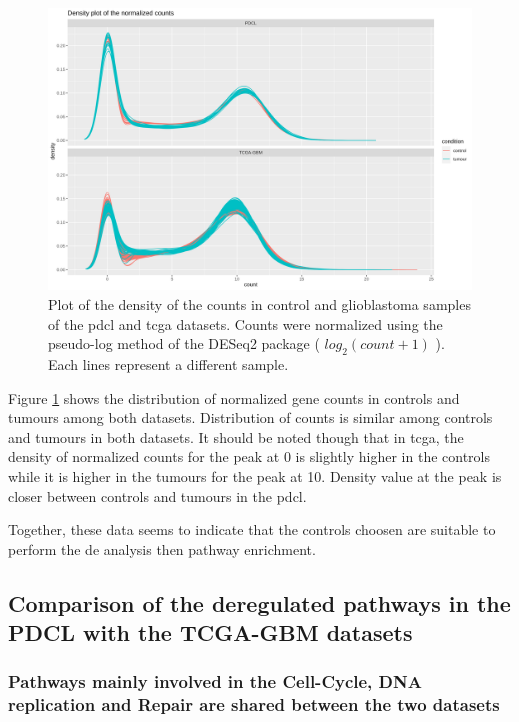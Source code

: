 \begin{figure}
    \includegraphics[width=\textwidth]{img/density_plot}
    \caption{
        Plot of the density of the counts in control and glioblastoma samples of the \acrshort{pdcl} and \acrshort{tcga} datasets.
        Counts were normalized using the pseudo-log method of the DESeq2 package ( $log_2(count+1)$ ).
        Each lines represent a different sample.
    }
    \label{fig:density-plot}
\end{figure}

Figure \ref*{fig:density-plot} shows the distribution of normalized gene counts in controls and tumours among both datasets.
Distribution of counts is similar among controls and tumours in both datasets.
It should be noted though that in \acrshort{tcga}, the density of normalized counts for the peak at 0 is slightly higher in the controls while it is higher in the tumours for the peak at 10.
Density value at the peak is closer between controls and tumours in the \acrshort{pdcl}.

Together, these data seems to indicate that the controls choosen are suitable to perform the \acrlong{de} analysis then pathway enrichment.

\subsection{Comparison of the deregulated pathways in the PDCL with the TCGA-GBM datasets}

\subsubsection{Pathways mainly involved in the Cell-Cycle, DNA replication and Repair are shared between the two datasets}

